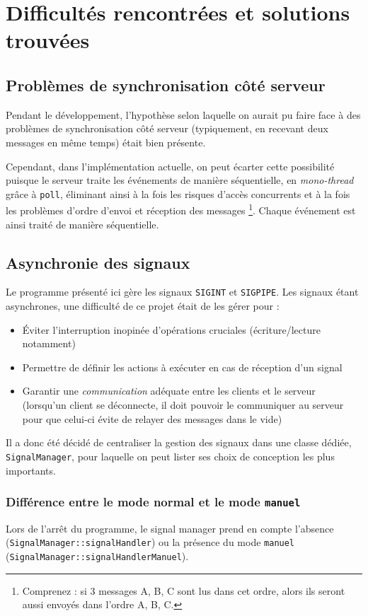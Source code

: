 \documentclass{article}
\begin{document}
\section{Difficultés rencontrées et solutions trouvées}
\subsection{Problèmes de synchronisation côté serveur}
Pendant le développement, l'hypothèse selon laquelle on aurait pu faire face à des problèmes de synchronisation côté serveur (typiquement, en recevant deux messages en même temps) était bien présente.

Cependant, dans l'implémentation actuelle, on peut écarter cette possibilité puisque le serveur traite les événements de manière séquentielle, en \textit{mono-thread} grâce à \texttt{poll}, éliminant ainsi à la fois les risques d'accès concurrents et à la fois les problèmes d'ordre d'envoi et réception des messages \footnote{Comprenez : si 3 messages A, B, C sont lus dans cet ordre, alors ils seront aussi envoyés dans l'ordre A, B, C.}. Chaque événement est ainsi traité de manière séquentielle.

\subsection{Asynchronie des signaux}
Le programme présenté ici gère les signaux \texttt{SIGINT} et \texttt{SIGPIPE}. Les signaux étant asynchrones, une difficulté de ce projet était de les gérer pour :
\begin{itemize}
    \item Éviter l'interruption inopinée d'opérations cruciales (écriture/lecture notamment)
    \item Permettre de définir les actions à exécuter en cas de réception d'un signal
    \item Garantir une \textit{communication} adéquate entre les clients et le serveur (lorsqu'un client se déconnecte, il doit pouvoir le communiquer au serveur pour que celui-ci évite de relayer des messages dans le vide)
\end{itemize}

Il a donc été décidé de centraliser la gestion des signaux dans une classe dédiée, \texttt{SignalManager}, pour laquelle on peut lister ses choix de conception les plus importants.



\subsubsection*{Différence entre le mode normal et le mode \texttt{manuel}}
Lors de l'arrêt du programme, le signal manager prend en compte l'absence (\texttt{SignalManager::signalHandler}) ou la présence du mode \texttt{manuel} (\texttt{SignalManager::signalHandlerManuel}).
\end{document}
